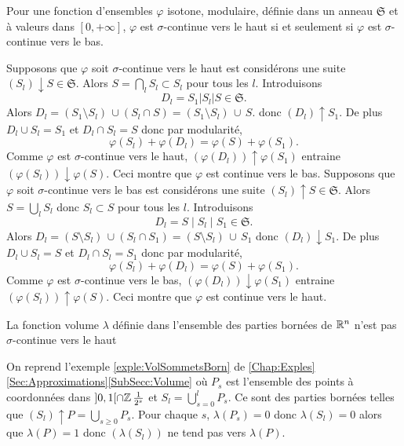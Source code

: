 \begin{propn}\label{Prop:contBssicontH}
 Pour une fonction d'ensembles $\varphi$ isotone, modulaire, définie dans un anneau $\mathfrak{S}$ et à valeurs dans $[0,+\infty]$, $\varphi$ est $\sigma$-continue vers le haut si et seulement si $\varphi$ est $\sigma$-continue vers le bas.
\end{propn}
\begin{demo}
 Supposons que $\varphi$ soit $\sigma$-continue vers le haut est considérons une suite $(S_l)\downarrow S \in \mathfrak{S}$. Alors $S = \bigcap_l S_l \subset S_l$ pour tous les $l$. Introduisons
 \begin{displaymath}
  D_l = S_1|S_l|S \in \mathfrak{S}.
 \end{displaymath}
Alors $D_l = (S_1 \setminus S_l)\, \cup (S_l \cap S) = (S_1 \setminus S_l)\, \cup \,  S.$ donc $(D_l)\uparrow S_1$. De plus $D_l \cup S_l = S_1$ et $D_l \cap S_l = S$ donc par modularité,
\begin{displaymath}
 \varphi(S_l) + \varphi(D_l) = \varphi(S) + \varphi(S_1).
\end{displaymath}
Comme $\varphi$ est $\sigma$-continue vers le haut, $(\varphi(D_l))\uparrow \varphi(S_1)$ entraine $(\varphi(S_l))\downarrow \varphi(S)$. Ceci montre que $\varphi$ est continue vers le bas.\newline
Supposons que $\varphi$ soit $\sigma$-continue vers le bas est considérons une suite $(S_l)\uparrow S \in \mathfrak{S}$. Alors $S = \bigcup_l S_l$ donc $ S_l \subset S$ pour tous les $l$. Introduisons
 \begin{displaymath}
  D_l = S \mid S_l \mid S_1 \in \mathfrak{S}.
 \end{displaymath}
 Alors $D_l = (S \setminus S_l)\, \cup (S_l \cap S_1) = (S \setminus S_l)\, \cup \,  S_1$ donc $(D_l)\downarrow S_1$. De plus $D_l \cup S_l = S$ et $D_l \cap S_l = S_1$ donc par modularité,
\begin{displaymath}
 \varphi(S_l) + \varphi(D_l) = \varphi(S) + \varphi(S_1).
\end{displaymath}
Comme $\varphi$ est $\sigma$-continue vers le bas, $(\varphi(D_l))\downarrow \varphi(S_1)$ entraine $(\varphi(S_l))\uparrow \varphi(S)$. Ceci montre que $\varphi$ est continue vers le haut.
\end{demo}

\begin{propn}\label{Prop:VolBornNonCont}
 La fonction volume $\lambda$ définie dans l'ensemble des parties bornées de $\mathbb{R}^n$ n'est pas $\sigma$-continue vers le haut
\end{propn}
\begin{demo}
 On reprend l'exemple \ref{exple:VolSommetsBorn} de \ref{Chap:Exples}\ref{Sec:Approximations}\ref{SubSecc:Volume} où $P_s$ est l'ensemble des points à coordonnées dans $]0,1[ \cap \mathbb{Z}\, \frac{1}{2^s}$ et $S_l = \bigcup_{s=0}^l P_s$. Ce sont des parties bornées telles que $(S_l)\uparrow P = \bigcup_{s\geq0} P_s$. Pour chaque $s$, $\lambda(P_s)=0$ donc $\lambda(S_l)=0$ alors que $\lambda(P) = 1$ donc $(\lambda(S_l))$ ne tend pas vers $\lambda(P)$.
\end{demo}

